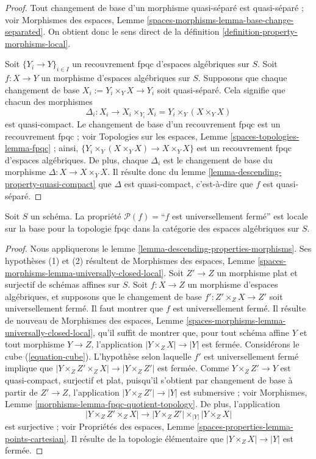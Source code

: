 \begin{proof}
Tout changement de base d'un morphisme quasi-séparé est quasi-séparé ; voir
Morphismes des espaces,
Lemme \ref{spaces-morphisms-lemma-base-change-separated}.
On obtient donc le sens direct de la
définition \ref{definition-property-morphisms-local}.

\medskip\noindent
Soit $\{Y_i \to Y\}_{i \in I}$ un recouvrement fpqc d'espaces algébriques sur $S$.
Soit $f : X \to Y$ un morphisme d'espaces algébriques sur $S$.
Supposons que chaque changement de base $X_i := Y_i \times_Y X \to Y_i$ soit quasi-séparé.
Cela signifie que chacun des morphismes
$$
\Delta_i :
X_i
\longrightarrow
X_i \times_{Y_i} X_i = Y_i \times_Y (X \times_Y X)
$$
est quasi-compact. Le changement de base d'un recouvrement fpqc est un recouvrement fpqc ; voir
Topologies sur les espaces, Lemme \ref{spaces-topologies-lemma-fpqc} ;
ainsi, $\{Y_i \times_Y (X \times_Y X) \to X \times_Y X\}$
est un recouvrement fpqc d'espaces algébriques. De plus, chaque
$\Delta_i$ est le changement de base du morphisme
$\Delta : X \to X \times_Y X$. Il résulte donc du
lemme \ref{lemma-descending-property-quasi-compact}
que $\Delta$ est quasi-compact, c'est-à-dire que $f$ est quasi-séparé.
\end{proof}

\begin{lemma}
\label{lemma-descending-property-universally-closed}
Soit $S$ un schéma.
La propriété $\mathcal{P}(f) =$``$f$ est universellement fermé''
est locale sur la base pour la topologie fpqc dans la catégorie des espaces algébriques sur $S$.
\end{lemma}

\begin{proof}
Nous appliquerons le
lemme \ref{lemma-descending-properties-morphisms}.
Ses hypothèses (1) et (2) résultent de
Morphismes des espaces,
Lemme \ref{spaces-morphisms-lemma-universally-closed-local}.
Soit $Z' \to Z$ un morphisme plat et surjectif de schémas affines sur $S$.
Soit $f : X \to Z$ un morphisme d'espaces algébriques, et supposons
que le changement de base $f' : Z' \times_Z X \to Z'$ soit universellement fermé.
Il faut montrer que $f$ est universellement fermé. Il résulte de nouveau de
Morphismes des espaces,
Lemme \ref{spaces-morphisms-lemma-universally-closed-local},
qu'il suffit de montrer que, pour tout schéma affine $Y$ et tout
morphisme $Y \to Z$, l'application $|Y \times_Z X| \to |Y|$ est fermée.
Considérons le cube (\ref{equation-cube}).
L'hypothèse selon laquelle $f'$ est universellement fermé implique que
$|Y \times_Z Z' \times_Z X| \to |Y \times_Z Z'|$ est fermée.
Comme $Y \times_Z Z' \to Y$ est quasi-compact, surjectif et plat,
puisqu'il s'obtient par changement de base à partir de $Z' \to Z$,
l'application $|Y \times_Z Z'| \to |Y|$ est submersive ; voir
Morphismes, Lemme \ref{morphisms-lemma-fpqc-quotient-topology}.
De plus, l'application
$$
|Y \times_Z Z' \times_Z X|
\longrightarrow
|Y \times_Z Z'| \times_{|Y|} |Y \times_Z X|
$$
est surjective ; voir
Propriétés des espaces, Lemme \ref{spaces-properties-lemma-points-cartesian}.
Il résulte de la topologie élémentaire que $|Y \times_Z X| \to |Y|$ est fermée.
\end{proof}

